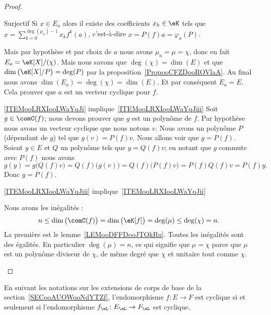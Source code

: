 \begin{proof}
\begin{subproof}
\begin{subproof}
                \item[Surjectif]
                    Si \( x\in E_a\) alors il existe des coefficients \( x_k\in \eK\) tels que \( x=\sum_{k=0}^{\deg(\mu_a)-1}x_kf^k(a)\), c'est-à-dire \( x=P(f)a=\varphi_a(P)\).
            \end{subproof}
            Mais par hypothèse et par choix de \( a\) nous avons \( \mu_a=\mu=\chi\), donc en fait \( E_a=\eK[X]/(\chi)\). Mais nous savons que \( \deg(\chi)=\dim(E)\) et que \( \dim\big( \eK[X]/P \big)=\deg(P)\) par la proposition~\ref{PropooCFZDooROVlaA}. Au final nous avons \( \dim(E_a)=\deg(\chi)=\dim(E)\). Et par conséquent \( E_a=E\). Cela prouver que \( a\) est un vecteur cyclique pour \( f\).

        \item[\ref{ITEMooLRXIooLWaYqJi} implique~\ref{ITEMooLRXIooLWaYqJiii}]
            Soit \( g\in \comC(f)\); nous devons prouver que \( g\) est un polynôme de \( f\). Par hypothèse nous avons un vecteur cyclique que nous notons \( v\). Nous avons un polynôme \( P\) (dépendant de \( g\)) tel que \( g(v)=P(f)v\). Nous allons voir que \( g=P(f)\). Soient \( y\in E\) et \( Q\) un polynôme tels que \( y=Q(f)v\); en notant que \( g\) commute avec \( P(f)\) nous avons
            \begin{equation}
                g(y)=g\big( Q(f)v \big)=Q(f)\big( g(v) \big)=Q(f)\big( P(f)v \big)=P(f)Q(f)v=P(f)y.
            \end{equation}
            Donc \( g=P(f)\).

        \item[\ref{ITEMooLRXIooLWaYqJiii} implique~\ref{ITEMooLRXIooLWaYqJii}]

            Nous avons les inégalités :
            \begin{equation}
                n\leq \dim\big( \comC(f) \big)=\dim\big( \eK[f] \big)=\deg(\mu)\leq \deg(\chi)=n.
            \end{equation}
            La première est le lemme~\ref{LEMooDFFDooJTQkRu}. Toutes les inégalités sont des égalités. En particulier \( \deg(\mu)=n\), ce qui signifie que \( \mu=\chi\) parce que \( \mu\) est un polynôme diviseur de \( \chi\), de même degré que \( \chi\) et unitaire tout comme \( \chi\).

    \end{subproof}
\end{proof}

\begin{corollary}        \label{CORooAKQEooSliXPp}
    En suivant les notations sur les extensions de corps de base de la section~\ref{SECooAUOWooNdYTZf}, l'endomorphisme \( f\colon E\to F\) est cyclique si et seulement si l'endomorphisme \( f_{\eL}\colon E_{\eL}\to F_{\eL}\) est cyclique.
\end{corollary}

